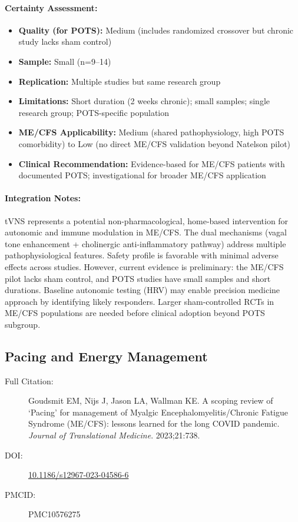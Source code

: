 \paragraph{Certainty Assessment:}
\begin{itemize}
    \item \textbf{Quality (for POTS):} Medium (includes randomized crossover but chronic study lacks sham control)
    \item \textbf{Sample:} Small (n=9--14)
    \item \textbf{Replication:} Multiple studies but same research group
    \item \textbf{Limitations:} Short duration (2 weeks chronic); small samples; single research group; POTS-specific population
    \item \textbf{ME/CFS Applicability:} Medium (shared pathophysiology, high POTS comorbidity) to Low (no direct ME/CFS validation beyond Natelson pilot)
    \item \textbf{Clinical Recommendation:} Evidence-based for ME/CFS patients with documented POTS; investigational for broader ME/CFS application
\end{itemize}

\paragraph{Integration Notes:}
tVNS represents a potential non-pharmacological, home-based intervention for autonomic and immune modulation in ME/CFS. The dual mechanisms (vagal tone enhancement + cholinergic anti-inflammatory pathway) address multiple pathophysiological features. Safety profile is favorable with minimal adverse effects across studies. However, current evidence is preliminary: the ME/CFS pilot lacks sham control, and POTS studies have small samples and short durations. Baseline autonomic testing (HRV) may enable precision medicine approach by identifying likely responders. Larger sham-controlled RCTs in ME/CFS populations are needed before clinical adoption beyond POTS subgroup.

\subsection{Pacing and Energy Management}

\begin{description}
    \item[Full Citation:] Goudsmit EM, Nijs J, Jason LA, Wallman KE. A scoping review of `Pacing' for management of Myalgic Encephalomyelitis/Chronic Fatigue Syndrome (ME/CFS): lessons learned for the long COVID pandemic. \textit{Journal of Translational Medicine}. 2023;21:738.
    \item[DOI:] \href{https://doi.org/10.1186/s12967-023-04586-6}{10.1186/s12967-023-04586-6}
    \item[PMCID:] PMC10576275
\end{description}

